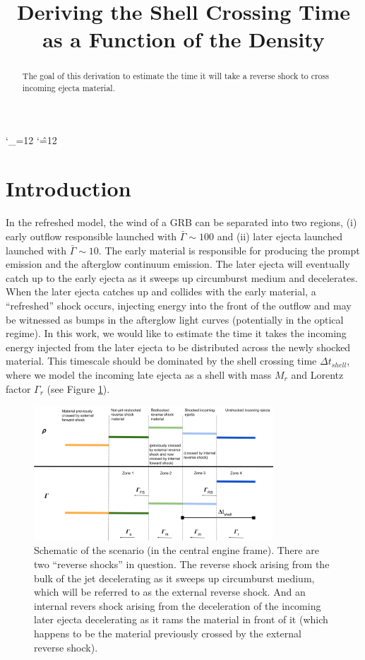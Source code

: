 \documentclass[linenumbers,twocolumn]{aastex631}
\def\upsubscripts{\catcode`\_=12 } \def\normalsubscripts{\catcode`\_=8 }
\def\upsupscripts{\catcode`\^=12 } \def\normalsupscripts{\catcode`\^=7 }
\begin{document}
\upsubscripts
\upsupscripts

\title{Deriving the Shell Crossing Time as a Function of the Density}


\begin{abstract}
The goal of this derivation to estimate the time it will take a reverse shock to cross incoming ejecta material.

\end{abstract}

\section{Introduction}

In the refreshed model, the wind of a GRB can be separated into two regions, (i) early outflow responsible launched with $\bar{\Gamma}\sim100$ and (ii) later ejecta launched launched with $\bar{\Gamma}\sim10$. The early material is responsible for producing the prompt emission and the afterglow continuum emission. The later ejecta will eventually catch up to the early ejecta as it sweeps up circumburst medium and decelerates. When the later ejecta catches up and collides with the early material, a ``refreshed'' shock occurs, injecting energy into the front of the outflow and may be witnessed as bumps in the afterglow light curves (potentially in the optical regime). In this work, we would like to estimate the time it takes the incoming energy injected from the later ejecta to be distributed across the newly shocked material. This timescale should be dominated by the shell crossing time $\Delta t_{shell}$, where we model the incoming late ejecta as a shell with mass $M_{r}$ and Lorentz factor $\Gamma_{r}$ (see Figure \ref{fig: schematic}).

\begin{figure}[t!]
    \centering
    \includegraphics[width=0.8\textwidth]{schematic.png}
    \caption{Schematic of the scenario (in the central engine frame). There are two ``reverse shocks'' in question. The reverse shock arising from the bulk of the jet decelerating as it sweeps up circumburst medium, which will be referred to as the external reverse shock. And an internal revers shock arising from the deceleration of the incoming later ejecta decelerating as it rams the material in front of it (which happens to be the material previously crossed by the external reverse shock).}
    \label{fig: schematic}
\end{figure}
\end{document}
